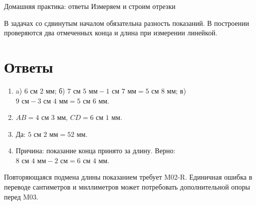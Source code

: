 \worksheettitle
  {Домашняя практика: ответы}
  { Измеряем и строим отрезки}

\begin{teacherbox}[Критерии]
  В задачах со сдвинутым началом обязательна разность показаний. В построении
  проверяются два отмеченных конца и длина при измерении линейкой.
\end{teacherbox}

\section{Ответы}

\begin{enumerate}
  \item a) $6\text{ см }2\text{ мм}$; б)
    $7\text{ см }5\text{ мм}-1\text{ см }7\text{ мм}
      =5\text{ см }8\text{ мм}$; в)
    $9\text{ см}-3\text{ см }4\text{ мм}=5\text{ см }6\text{ мм}$.
  \item $AB=4\text{ см }3\text{ мм}$, $CD=6\text{ см }1\text{ мм}$.
  \item Да: $5\text{ см }2\text{ мм}=52\text{ мм}$.
  \item Причина: показание конца принято за длину. Верно:
    $8\text{ см }4\text{ мм}-2\text{ см}=6\text{ см }4\text{ мм}$.
\end{enumerate}

\begin{resultbox}[Маршрут]
  Повторяющаяся подмена длины показанием требует M02-R. Единичная ошибка в
  переводе сантиметров и миллиметров может потребовать дополнительной опоры
  перед M03.
\end{resultbox}

